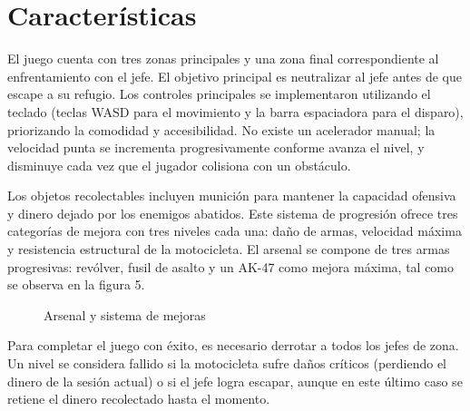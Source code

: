 \section{Características}

El juego cuenta con tres zonas principales y una zona final correspondiente al enfrentamiento con el jefe. El objetivo principal es neutralizar al jefe antes de que escape a su refugio. Los controles principales se implementaron utilizando el teclado (teclas WASD para el movimiento y la barra espaciadora para el disparo), priorizando la comodidad y accesibilidad. No existe un acelerador manual; la velocidad punta se incrementa progresivamente conforme avanza el nivel, y disminuye cada vez que el jugador colisiona con un obstáculo.

Los objetos recolectables incluyen munición para mantener la capacidad ofensiva y dinero dejado por los enemigos abatidos. Este sistema de progresión ofrece tres categorías de mejora con tres niveles cada una: daño de armas, velocidad máxima y resistencia estructural de la motocicleta. El arsenal se compone de tres armas progresivas: revólver, fusil de asalto y un AK-47 como mejora máxima, tal como se observa en la figura 5.

\begin{figure}[H]
    \centering
    \caption{Arsenal y sistema de mejoras}
    \label{fig:armas_mejoras}
\end{figure}

Para completar el juego con éxito, es necesario derrotar a todos los jefes de zona. Un nivel se considera fallido si la motocicleta sufre daños críticos (perdiendo el dinero de la sesión actual) o si el jefe logra escapar, aunque en este último caso se retiene el dinero recolectado hasta el momento.
